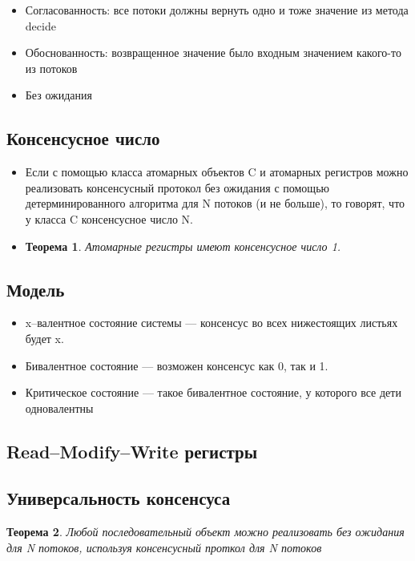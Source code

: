 \documentclass[10pt,a4paper,oneside,titlepage]{article}
\theoremstyle{plain}
\newtheorem{theorem}{Теорема}[section]
\theoremstyle{defenition}
\begin{document}
\begin{itemize}
	\item Согласованность: все потоки должны вернуть одно и тоже значение из метода decide
	\item Обоснованность: возвращенное значение было входным значением какого-то из потоков
	\item Без ожидания
\end{itemize}

\subsection{Консенсусное число}
\begin{itemize}
	\item Если с помощью класса атомарных объектов C и атомарных регистров можно реализовать консенсусный протокол без ожидания с помощью детерминированного алгоритма для N потоков (и не больше), то говорят, что у класса C консенсусное число N.
	\item \begin{theorem}
		Атомарные регистры имеют консенсусное число 1.
	\end{theorem} 
\end{itemize}

\subsection{Модель}
\begin{itemize}
	\item x--валентное состояние системы --- консенсус во всех нижестоящих листьях будет x.
	\item Бивалентное состояние --- возможен консенсус как 0, так и 1.
	\item Критическое состояние --- такое бивалентное состояние, у которого все дети одновалентны
\end{itemize}

\subsection{Read--Modify--Write регистры}

\subsection{Универсальность консенсуса}
\begin{theorem}
	Любой последовательный объект можно реализовать без ожидания для N потоков, используя консенсусный проткол для N потоков
\end{theorem}
\end{document}
